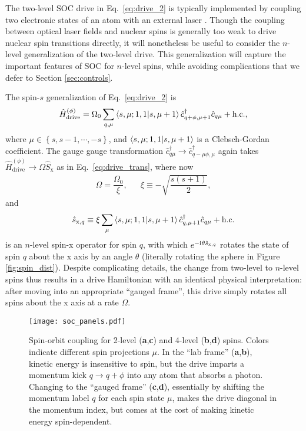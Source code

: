 \documentclass[aps,pra,nofootinbib,twocolumn,superscriptaddress]{revtex4-2}
\renewcommand{\t}{\text} %
\newcommand{\f}[2]{\dfrac{#1}{#2}} %
\renewcommand{\set}[1]{\left\{#1\right\}} %
\newcommand{\bk}{\braket} %
\renewcommand{\i}{\mathrm{i}\mkern1mu} %
\newcommand{\1}{\mathds{1}}
\renewcommand{\c}{\hat c}
\newcommand{\s}{\hat s}
\renewcommand{\H}{\hat H}
\renewcommand{\S}{\hat S}
\newcommand{\x}{\text{x}}
\begin{document}
The two-level SOC drive in Eq.~\eqref{eq:drive_2} is typically implemented by coupling two electronic states of an atom with an external laser \cite{wall2016synthetic, livi2016synthetic, kolkowitz2016spinorbitcoupled, bromley2018dynamics, he2019engineering}.
Though the coupling between optical laser fields and nuclear spins is generally too weak to drive nuclear spin transitions directly, it will nonetheless be useful to consider the $n$-level generalization of the two-level drive.
This generalization will capture the important features of SOC for $n$-level spins, while avoiding complications that we defer to Section \ref{sec:controls}.

The spin-$s$ generalization of Eq.~\eqref{eq:drive_2} is
\begin{align}
  \H_{\t{drive}}^{(\phi)} = \Omega_0 \sum_{q,\mu} \bk{s,\mu;1,1|s,\mu+1}
  \c_{q+\phi,\mu+1}^\dag \c_{q\mu} + \t{h.c.},
\end{align}
where $\mu\in\set{s,s-1,\cdots,-s}$, and $\bk{s,\mu;1,1|s,\mu+1}$ is a Clebsch-Gordan coefficient.
The gauge gauge transformation $\c_{q\mu}^\dag\to \c_{q-\mu\phi,\mu}^\dag$ again takes $\H_{\t{drive}}^{(\phi)}\to \Omega \S_\x$ as in Eq.~\eqref{eq:drive_trans}, where now
\begin{align}
  \Omega = \f{\Omega_0}{\xi},
  &&
  \xi \equiv -\sqrt{\f{s(s+1)}{2}},
\end{align}
and
\begin{align}
  \s_{\x,q} \equiv \xi \sum_\mu \bk{s,\mu;1,1|s,\mu+1} \c_{q,\mu+1}^\dag \c_{q\mu} + \t{h.c.}
  \label{eq:spin_x_op}
\end{align}
is an $n$-level spin-x operator for spin $q$, with which $e^{-\i\theta \s_{\x,q}}$ rotates the state of spin $q$ about the x axis by an angle $\theta$ (literally rotating the sphere in Figure \ref{fig:spin_dist}).
Despite complicating details, the change from two-level to $n$-level spins thus results in a drive Hamiltonian with an identical physical interpretation: after moving into an appropriate ``gauged frame'', this drive simply rotates all spins about the x axis at a rate $\Omega$.

\begin{figure}
\centering
\texttt{[image: soc\_panels.pdf]}
\caption{
Spin-orbit coupling for 2-level ({\bf a},{\bf c}) and 4-level ({\bf b},{\bf d}) spins.
Colors indicate different spin projections $\mu$.
In the ``lab frame'' ({\bf a},{\bf b}), kinetic energy is insensitive to spin, but the drive imparts a momentum kick $q\to q+\phi$ into any atom that absorbs a photon.
Changing to the ``gauged frame'' ({\bf c},{\bf d}), essentially by shifting the momentum label $q$ for each spin state $\mu$, makes the drive diagonal in the momentum index, but comes at the cost of making kinetic energy spin-dependent.
}
\label{fig:soc_panels}
\end{figure}
\end{document}
